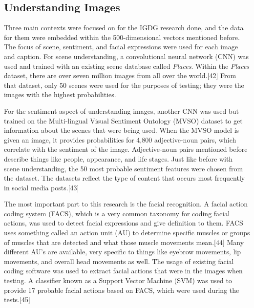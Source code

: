 \documentclass[letterpaper, 10 pt, conference]{IEEEtran}
\begin{document}
\subsection{Understanding Images}
Three main contexts were focused on for the IGDG research done, and the data for them were embedded within the 500-dimensional vectors mentioned before. The focus of scene, sentiment, and facial expressions were used for each image and caption. For scene understanding, a convolutional neural network (CNN) was used and trained with an existing scene database called \textit{Places}. Within the \textit{Places} dataset, there are over seven million images from all over the world.[42] From that dataset, only 50 scenes were used for the purposes of testing; they were the  images with the highest probabilities.
\par For the sentiment aspect of understanding images, another CNN was used but trained on the Multi-lingual Visual Sentiment Ontology (MVSO) dataset to get information about the scenes that were being used. When the MVSO model is given an image, it provides probabilities for 4,800 adjective-noun pairs, which correlate with the sentiment of the image. Adjective-noun pairs mentioned before describe things like people, appearance, and life stages. Just like before with scene understanding, the 50 most probable sentiment features were chosen from the dataset. The datasets reflect the type of content that occurs most frequently in social media posts.[43]
\par The most important part to this research is the facial recognition. A facial action coding system (FACS), which is a very common taxonomy for coding facial actions, was used to detect facial expressions and give definition to them. FACS uses something called an action unit (AU) to determine specific muscles or groups of muscles that are detected and what those muscle movements mean.[44] Many different AU's are available, very specific to things like eyebrow movements, lip movements, and overall head movements as well. The usage of existing facial coding software was used to extract facial actions that were in the images when testing. A classifier known as a Support Vector Machine (SVM) was used to provide 17 probable facial actions based on FACS, which were used during the tests.[45]
\end{document}
